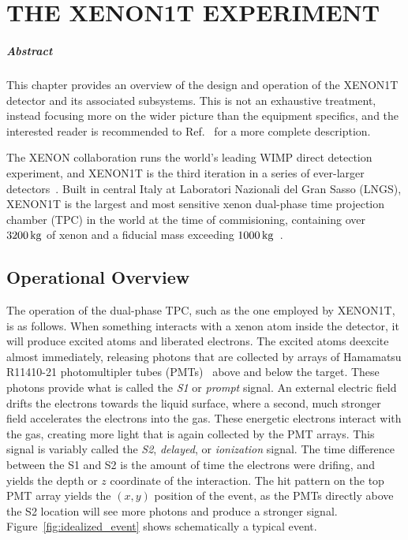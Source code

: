 
\chapter{THE XENON1T EXPERIMENT}\label{ch:xe1t}

\paragraph{Abstract} This chapter provides an overview of the design and operation of the XENON1T detector and its associated subsystems. This is not an exhaustive treatment, instead focusing more on the wider picture than the equipment specifics, and the interested reader is recommended to Ref.~\cite{Aprile:2017aty} for a more complete description.

The XENON collaboration runs the world's leading WIMP direct detection experiment, and XENON1T is the third iteration in a series of ever-larger detectors~\cite{Angle:2007uj,Aprile:2011dd}. Built in central Italy at Laboratori Nazionali del Gran Sasso (LNGS), XENON1T is the largest and most sensitive xenon dual-phase time projection chamber (TPC) in the world at the time of commisioning, containing over $3200\,\mathrm{kg}$ of xenon and a fiducial mass exceeding $1000\,\mathrm{kg}$~\cite{Aprile:2017iyp}.

\section{Operational Overview}

The operation of the dual-phase TPC, such as the one employed by XENON1T, is as follows. When something interacts with a xenon atom inside the detector, it will produce excited atoms and liberated electrons. The excited atoms deexcite almost immediately, releasing photons that are collected by arrays of Hamamatsu R11410-21 photomultipler tubes (PMTs)~\cite{Aprile:2015lha} above and below the target. These photons provide what is called the \textit{S1} or \textit{prompt} signal. An external electric field drifts the electrons towards the liquid surface, where a second, much stronger field accelerates the electrons into the gas. These energetic electrons interact with the gas, creating more light that is again collected by the PMT arrays. This signal is variably called the \textit{S2}, \textit{delayed}, or \textit{ionization} signal. The time difference between the S1 and S2 is the amount of time the electrons were drifing, and yields the depth or $z$ coordinate of the interaction. The hit pattern on the top PMT array yields the $(x,y)$ position of the event, as the PMTs directly above the S2 location will see more photons and produce a stronger signal. Figure~\ref{fig:idealized_event} shows schematically a typical event.

